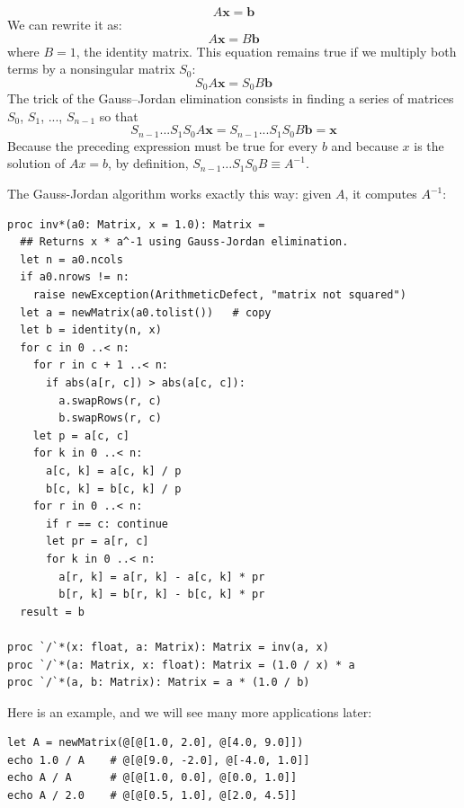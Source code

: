 \documentclass[justified, sixbynine]{tufte-book}
\def\ft{\small\tt}
\theoremstyle{plain}%
\newtheorem * {corollary}{Corollary}
\theoremstyle{definition}
\theoremstyle{remark}
\newtheorem * {remark}{Remark}
\newtheorem * {note}{Note}
\begin{document}
\begin{fullwidth}
\begin{equation}
A \mathbf{x} = \mathbf{b}
\end{equation}
We can rewrite it as:
\begin{equation}
A \mathbf{x} = B \mathbf{b}
\end{equation}
where $B=1$, the identity matrix. This equation remains true if we multiply both terms by a nonsingular matrix $S_0$:
\begin{equation}
S_0 A \mathbf{x} = S_0 B \mathbf{b}
\end{equation}
The trick of the Gauss--Jordan elimination consists in finding a series of matrices $S_0$, $S_1$, ..., $S_{n-1}$ so that
\begin{equation}
S_{n-1} ... S_1 S_0 A \mathbf{x} = S_{n-1} ... S_1 S_0 B \mathbf{b} = \mathbf{x}
\end{equation}
Because the preceding expression must be true for every $b$ and because $x$ is the solution of $A x=b$, by definition,
$S_{n-1} \ldots S_1 S_0 B \equiv A^{-1}$.

The Gauss-Jordan algorithm works exactly this way: given $A$, it computes $A^{-1}$:

\begin{lstlisting}[caption={in file: {\ft nlib/matrix.nim}}]
proc inv*(a0: Matrix, x = 1.0): Matrix =
  ## Returns x * a^-1 using Gauss-Jordan elimination.
  let n = a0.ncols
  if a0.nrows != n:
    raise newException(ArithmeticDefect, "matrix not squared")
  let a = newMatrix(a0.tolist())   # copy
  let b = identity(n, x)
  for c in 0 ..< n:
    for r in c + 1 ..< n:
      if abs(a[r, c]) > abs(a[c, c]):
        a.swapRows(r, c)
        b.swapRows(r, c)
    let p = a[c, c]
    for k in 0 ..< n:
      a[c, k] = a[c, k] / p
      b[c, k] = b[c, k] / p
    for r in 0 ..< n:
      if r == c: continue
      let pr = a[r, c]
      for k in 0 ..< n:
        a[r, k] = a[r, k] - a[c, k] * pr
        b[r, k] = b[r, k] - b[c, k] * pr
  result = b

proc `/`*(x: float, a: Matrix): Matrix = inv(a, x)
proc `/`*(a: Matrix, x: float): Matrix = (1.0 / x) * a
proc `/`*(a, b: Matrix): Matrix = a * (1.0 / b)
\end{lstlisting}

Here is an example, and we will see many more applications later:

\begin{lstlisting}
let A = newMatrix(@[@[1.0, 2.0], @[4.0, 9.0]])
echo 1.0 / A    # @[@[9.0, -2.0], @[-4.0, 1.0]]
echo A / A      # @[@[1.0, 0.0], @[0.0, 1.0]]
echo A / 2.0    # @[@[0.5, 1.0], @[2.0, 4.5]]
\end{lstlisting}


\end{fullwidth}
\end{document}
